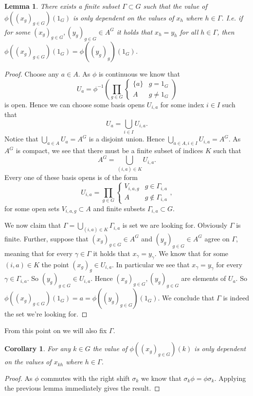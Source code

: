 \documentclass[titlepage, a4paper]{article}
\newtheorem{lemma}[theorem]{Lemma}
\newtheorem{corollary}[theorem]{Corollary}
\theoremstyle{remark}
\begin{document}
\begin{lemma}
	There exists a finite subset $\Gamma \subset G$ such that the value of $\phi((x_g)_{g \in G})(1_G)$ is only dependent on the values of $x_h$ where  $h \in \Gamma$. 
	I.e. if for some  $(x_g)_{g \in G}, (y_g)_{g \in G} \in A^{G}$ it holds that $x_h = y_h$ for all $h \in \Gamma$, then $\phi((x_g)_{g \in G})(1_G) = \phi((y_g)_g)(1_G)$.
\end{lemma}
\begin{proof}
	Choose any $a \in A$. As $\phi$ is continuous we know that \[
	U_a = \phi^{-1}\left( \prod_{g\in G} \begin{cases}
			\{a\} & g = 1_G\\
			A & g \ne 1_G
	\end{cases} \right)
\]
	is open. Hence we can choose some basis opens $U_{i, a}$ for some index $i \in I$ such that  \[
		U_a= \bigcup_{i \in I} U_{i,a}
	.\] 
	Notice that $\bigcup_{a \in A} U_a = A^{G}$ is a disjoint union. 
	Hence $\bigcup_{a \in A, i \in I} U_{i, a} = A^{G}$. 
	As $A^{G}$ is compact, we see that there must be a finite subset of indices $K$ such that \[
		A^{G} = \bigcup_{(i, a) \in K} U_{i, a}
	.\] 
	Every one of these basis opens is of the form \[
	U_{i,a} = \prod_{g \in G} \begin{cases}
		V_{i,a,g} & g \in \Gamma_{i,a}\\
		A & g \not\in \Gamma_{i,a}
	\end{cases}
	,\]
	for some open sets $V_{i,a,g} \subset A$ and finite subsets $\Gamma_{i,a} \subset G$. 

	We now claim that $\Gamma = \bigcup_{(i,a) \in K} \Gamma_{i,a}$ is set we are looking for. 
	Obviously $\Gamma$ is finite. 
	Further, suppose that $(x_g)_{g\in G} \in A^{G}$ and $(y_g)_{g \in G} \in A^{G}$ agree on $\Gamma$,
	meaning that for every $\gamma \in \Gamma$ it holds that  $x_\gamma = y_\gamma$.
	We know that for some  $(i, a) \in K$ the point $(x_g)_g \in U_{i,a}$. 
	In particular we see that $x_\gamma = y_\gamma$ for every $\gamma \in \Gamma_{i,a}$. 
	So $(y_g)_{g \in G} \in U_{i, a}$. 
	Hence  $(x_g)_{g \in G} , (y_g)_{g \in G}$ are elements of $U_a$. 
	So  $\phi((x_g)_{g \in G})(1_G) = a = \phi((y_g)_{g \in G})(1_G) $.
	We conclude that $\Gamma$ is indeed the set we're looking for.
\end{proof}
From this point on we will also fix $\Gamma$. 
\begin{corollary}
	For any $k \in G$ the value of $\phi((x_g)_{g \in G})(k)$ is only dependent on the values of $x_{kh}$ where $h \in \Gamma$.
\end{corollary}	
\begin{proof}
	As $\phi$ commutes with the right shift  $\sigma_k$ we know that $\sigma_k\phi = \phi\sigma_k$. Applying the previous lemma immediately gives the result.
\end{proof}
\end{document}
